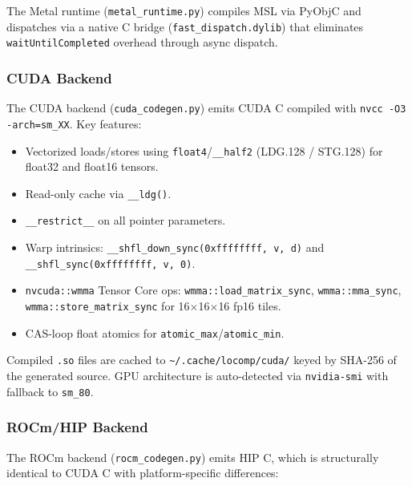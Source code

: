 \documentclass[10pt,twocolumn]{article}
\begin{document}
The Metal runtime (\texttt{metal\_runtime.py}) compiles MSL via PyObjC and
dispatches via a native C bridge (\texttt{fast\_dispatch.dylib}) that eliminates
\texttt{waitUntilCompleted} overhead through async dispatch.

\subsubsection{CUDA Backend}

The CUDA backend (\texttt{cuda\_codegen.py}) emits CUDA C compiled with
\texttt{nvcc -O3 -arch=sm\_XX}. Key features:
\begin{itemize}[noitemsep]
  \item Vectorized loads/stores using \texttt{float4}/\texttt{\_\_half2}
        (LDG.128 / STG.128) for float32 and float16 tensors.
  \item Read-only cache via \texttt{\_\_ldg()}.
  \item \texttt{\_\_restrict\_\_} on all pointer parameters.
  \item Warp intrinsics: \texttt{\_\_shfl\_down\_sync(0xffffffff, v, d)} and
        \texttt{\_\_shfl\_sync(0xffffffff, v, 0)}.
  \item \texttt{nvcuda::wmma} Tensor Core ops: \texttt{wmma::load\_matrix\_sync},
        \texttt{wmma::mma\_sync}, \texttt{wmma::store\_matrix\_sync} for
        16$\times$16$\times$16 fp16 tiles.
  \item CAS-loop float atomics for \texttt{atomic\_max}/\texttt{atomic\_min}.
\end{itemize}

Compiled \texttt{.so} files are cached to \texttt{\textasciitilde/.cache/locomp/cuda/}
keyed by SHA-256 of the generated source. GPU architecture is auto-detected via
\texttt{nvidia-smi} with fallback to \texttt{sm\_80}.

\subsubsection{ROCm/HIP Backend}

The ROCm backend (\texttt{rocm\_codegen.py}) emits HIP C, which is
structurally identical to CUDA C with platform-specific differences:
\end{document}
